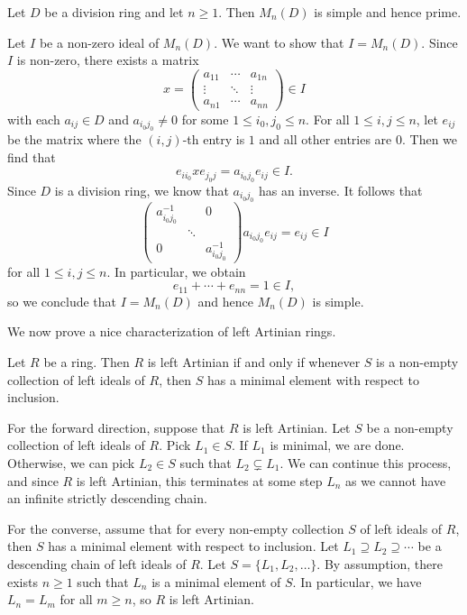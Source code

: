 \begin{prop}{}
Let $D$ be a division ring and let $n \geq 1$. Then $M_n(D)$ is simple and hence prime. 
\end{prop}
\begin{pf}
Let $I$ be a non-zero ideal of $M_n(D)$. We want to show that $I = M_n(D)$. Since $I$ is 
non-zero, there exists a matrix 
\[ x = \begin{pmatrix} a_{11} & \cdots & a_{1n} \\ \vdots & \ddots & \vdots \\ a_{n1} & \cdots & a_{nn} \end{pmatrix} \in I \]
with each $a_{ij} \in D$ and $a_{i_0j_0} \neq 0$ for some $1 \leq i_0, j_0 \leq n$. For all 
$1 \leq i, j \leq n$, let $e_{ij}$ be the matrix where the $(i,j)$-th entry is $1$ and all other entries
are $0$. Then we find that 
\[ e_{ii_0}xe_{j_0j} = a_{i_0j_0}e_{ij} \in I. \]
Since $D$ is a division ring, we know that $a_{i_0j_0}$ has an inverse. It follows that 
\[ \begin{pmatrix} a_{i_0j_0}^{-1} & & 0 \\ & \ddots \\ 0 & & a_{i_0j_0}^{-1} \end{pmatrix} a_{i_0j_0} e_{ij} = e_{ij} \in I \]
for all $1 \leq i, j \leq n$. In particular, we obtain 
\[ e_{11} + \cdots + e_{nn} = 1 \in I, \]
so we conclude that $I = M_n(D)$ and hence $M_n(D)$ is simple. 
\end{pf}

We now prove a nice characterization of left Artinian rings. 

\begin{prop}{}
Let $R$ be a ring. Then $R$ is left Artinian if and only if whenever $S$ is a non-empty collection 
of left ideals of $R$, then $S$ has a minimal element with respect to inclusion. 
\end{prop}
\begin{pf}
For the forward direction, suppose that $R$ is left Artinian. Let $S$ be a non-empty collection of 
left ideals of $R$. Pick $L_1 \in S$. If $L_1$ is minimal, we are done. Otherwise, we can pick $L_2 
\in S$ such that $L_2 \subsetneq L_1$. We can continue this process, and since $R$ is left 
Artinian, this terminates at some step $L_n$ as we cannot have an infinite strictly descending chain.

For the converse, assume that for every non-empty collection $S$ of left ideals of $R$, then 
$S$ has a minimal element with respect to inclusion. Let $L_1 \supseteq L_2 \supseteq \cdots$ 
be a descending chain of left ideals of $R$. Let $S = \{L_1, L_2, \dots\}$. By assumption, there 
exists $n \geq 1$ such that $L_n$ is a minimal element of $S$. In particular, we have 
$L_n = L_m$ for all $m \geq n$, so $R$ is left Artinian.
\end{pf}

